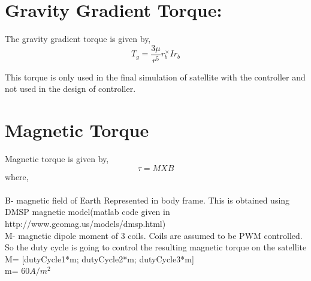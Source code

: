 \documentclass[10pt,a4paper]{report}
\begin{document}
\section{Gravity Gradient Torque:}
The gravity gradient torque is given by,
	\begin{equation}
	T_{g}=\frac{3\mu}{r^{5}}r_{b}^{\times}Ir_{b}
	\end{equation}

This torque is only used in the final simulation of satellite with the controller and not used in the design of controller.

\section{Magnetic Torque}

Magnetic torque is given by,
\begin{equation}
\tau=M X B
\end{equation}
where,\\ \\
B- magnetic field of Earth Represented in body frame. This is obtained using DMSP magnetic model(matlab code given in http://www.geomag.us/models/dmsp.html)\\ 
M- magnetic dipole moment of 3 coils.
Coils are assumed to be PWM controlled. So the duty cycle is going to control the resulting magnetic torque on the satellite \\
M= [dutyCycle1*m; dutyCycle2*m; dutyCycle3*m]\\
m= $60A/m^2$
\end{document}
